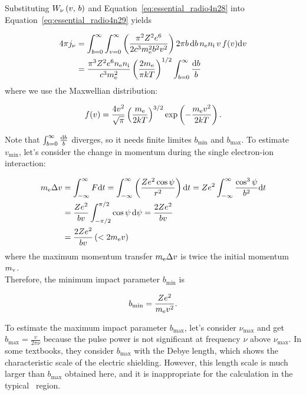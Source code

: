 Substituting $W_{\mathrm{\nu}}\left(v,\,b\right)$ and Equation~\ref{eq:essential_radio4n28} into Equation~\ref{eq:essential_radio4n29} yields

\begin{align}
    4 \pi j_{\nu} &= \int_{b=0}^{\infty} \int_{v=0}^{\infty} \left(\frac{\pi^2 Z^2 e^6}{2 c^3 m_{\mathrm{e}}^2 b^2 v^2}\right) 2 \pi b\,\mathrm{d} b\,n_{\mathrm{e}} n_{\mathrm{i}}\,v\,f(v) \mathrm{d} v \label{eq:essential_radio4n30}\\
                  &=\frac{\pi^{3} Z^{2} e^{6} n_{\mathrm{e}} n_{\mathrm{i}}}{c^{3} m_{\mathrm{e}}^{2}} \left(\frac{2m_{\mathrm{e}}}{\pi k T}\right)^{1/2}\int_{b=0}^{\infty} \frac{\mathrm{d} b}{b}\label{eq:essential_radio4n31}
\end{align}
where we use the Maxwellian distribution:

\begin{equation}\label{eq:essential_radio4n34}
    f(v)=\frac{4 v^2}{\sqrt{\pi}} \left(\frac{m_{\mathrm{e}}}{2 k T}\right)^{3/2} \exp \left(-\frac{m_{\mathrm{e}} v^2}{2 k T}\right).
\end{equation}

Note that $\int^{\infty}_{b=0} \frac{\mathrm{d} b}{b}$ diverges, so it needs finite limites $b_{\min}$ and $b_{\max}$.
To estimate $v_{\min}$, let's consider the change in momentum during the single electron-ion interaction:

\begin{align}\label{eq:essential_radio4n40}
    m_{\mathrm{e}} \Delta v &= \int_{-\infty}^{\infty} F \mathrm{d} t = \int_{-\infty}^{\infty}\left(\frac{Z e^{2} \cos \psi}{r^{2}}\right) \mathrm{d} t=Z e^{2} \int_{-\infty}^{\infty} \frac{\cos ^{3} \psi}{b^{2}} \mathrm{d} t \\
                      &= \frac{Z e^{2}}{b v} \int_{-\pi / 2}^{\pi / 2} \cos \psi\,\mathrm{d} \psi=\frac{2 Z e^{2}}{b v} \\
                      &= \frac{2Ze^2}{bv} \left(< 2m_{\mathrm{e}}v\right)
\end{align}
where the maximum momentum transfer $m_{\mathrm{e}} \Delta v$ is twice the initial momentum $m_{\mathrm{v}}$. \\

Therefore, the minimum impact parameter $b_{\min}$ is

\begin{equation}\label{eq:essential_radio4n43}
    b_{\min} = \frac{Ze^2}{m_{\mathrm{e}}v^2}.
\end{equation}

To estimate the maximum impact parameter $b_{\max}$, let's consider $\nu_{\max}$ and get $b_{\max} = \frac{v}{2\pi \nu}$ because the pulse power is not significant at frequency $\nu$ above $\nu_{\max}$.
In some textbooks, they consider $b_{\max}$ with the Debye length, which shows the characteristic scale of the electric shielding.
However, this length scale is much larger than $b_{\max}$ obtained here, and it is inappropriate for the calculation in the typical \ih~region.

